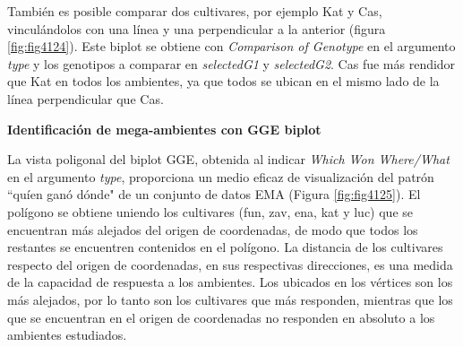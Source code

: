 También es posible comparar dos cultivares, por ejemplo Kat y Cas, vinculándolos con una línea y una perpendicular a la anterior (figura \ref{fig:fig4124}). Este biplot se obtiene con \emph{Comparison of Genotype} en el argumento \emph{type} y los genotipos a comparar en \emph{selectedG1} y \emph{selectedG2}. Cas fue más rendidor que Kat en todos los ambientes, ya que todos se ubican en el mismo lado de la línea perpendicular que Cas. 



\textbf{Identificación de mega-ambientes con GGE biplot}

La vista poligonal del biplot GGE, obtenida al indicar \emph{Which Won Where/What} en el argumento \emph{type}, proporciona un medio eficaz de visualización del patrón ``quíen ganó dónde"  de un conjunto de datos EMA (Figura \ref{fig:fig4125}).  El polígono se obtiene uniendo los cultivares (fun, zav, ena, kat y luc) que se encuentran más alejados del origen de coordenadas, de modo que todos los restantes se encuentren contenidos en el polígono. La distancia de los cultivares respecto del origen de coordenadas, en sus respectivas direcciones, es una medida de la capacidad de respuesta a los ambientes. Los ubicados en los vértices son los más alejados, por lo tanto son los cultivares que más responden, mientras que los que se encuentran en el origen de coordenadas no responden en absoluto a los ambientes estudiados.

